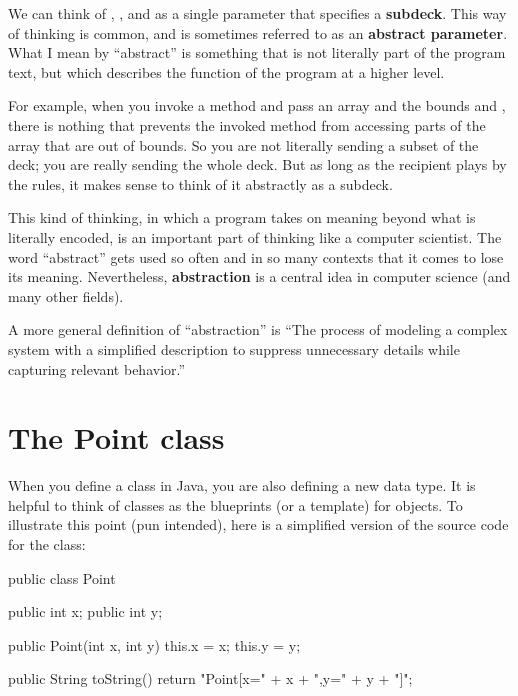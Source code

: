 
We can think of , , and  as a single parameter that specifies a {\bf subdeck}.
This way of thinking is common, and is sometimes referred to as an {\bf abstract parameter}.
What I mean by ``abstract'' is something that is not literally part of the program text, but which describes the function of the program at a higher level.

For example, when you invoke a method and pass an array and the bounds  and , there is nothing that prevents the invoked method from accessing parts of the array that are out of bounds.
So you are not literally sending a subset of the deck; you are really sending the whole deck.
But as long as the recipient plays by the rules, it makes sense to think of it abstractly as a subdeck.

This kind of thinking, in which a program takes on meaning beyond what is literally encoded, is an important part of thinking like a computer scientist.
The word ``abstract'' gets used so often and in so many contexts that it comes to lose its meaning.
Nevertheless, {\bf abstraction} is a central idea in computer science (and many other fields).


A more general definition of ``abstraction'' is ``The process of modeling a complex system with a simplified description to suppress unnecessary details while capturing relevant behavior.''




\section{The Point class}

When you define a class in Java, you are also defining a new data type.
It is helpful to think of classes as the blueprints (or a template) for objects.
To illustrate this point (pun intended), here is a simplified version of the source code for the  class:

\begin{code}
public class Point {

    public int x;
    public int y;

    public Point(int x, int y) {
        this.x = x;
        this.y = y;
    }

    public String toString() {
        return "Point[x=" + x + ",y=" + y + "]";
    }

}
\end{code}

